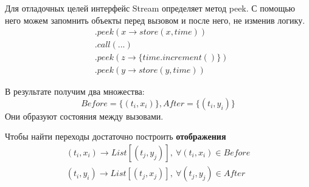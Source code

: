 \begin{frame}
\frametitle{\insertsection} 
\framesubtitle{\insertsubsection}
Для отладочных целей интерфейс Stream определяет метод peek.
С помощью него можем запомнить объекты перед вызовом и после него, не изменив логику.
\begin{align*}
	&.peek(x \rightarrow store(x, time)) \\
	&.call(...)\\
	&.peek(z \rightarrow \{time.increment()\})\\
	&.peek(y \rightarrow store(y, time))
\end{align*}

В результате получим два множества: 
$$Before = \{(t_i, x_i)\}, After = \{(t_i, y_i)\}$$
Они образуют состояния между вызовами.

Чтобы найти переходы достаточно построить \textbf{отображения}
\begin{align*}
	(t_i, x_i) \rightarrow List[(t_j, y_j)], \ \forall (t_i, x_i) \in Before \\
	(t_i, y_i) \rightarrow List[(t_j, x_j)], \ \forall (t_j, y_j) \in After
\end{align*}

\end{frame}
